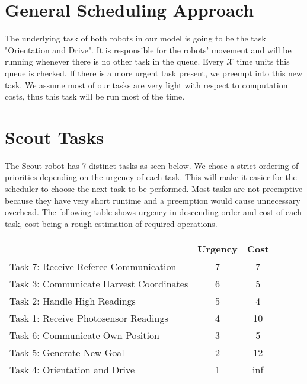 \documentclass[12pt]{article}
\begin{document}

\lstset{language=C}


\section*{General Scheduling Approach}
The underlying task of both robots in our model is going to be the task "Orientation and Drive". It is responsible for the robots' movement and will be running whenever there is no other task in the queue. Every $\mathcal{X}$ time units this queue is checked. If there is a more urgent task present, we preempt into this new task. We assume most of our tasks are very light with respect to computation costs, thus this task will be run most of the time.

\newpage
\section*{Scout Tasks}
The Scout robot has 7 distinct tasks as seen below. We chose a strict ordering of priorities depending on the urgency of each task. This will make it easier for the scheduler to choose the next task to be performed. Most tasks are not preemptive because they have very short runtime and a preemption would cause unnecessary overhead. The following table shows urgency in descending order and cost of each task, cost being a rough estimation of required operations.
\begin{center}
\begin{tabular}{| l | | c | c |}
  \hline
	& Urgency & Cost \\
  \hline
  Task 7: Receive Referee Communication & 7 & 7 \\
  Task 3: Communicate Harvest Coordinates & 6 & 5 \\
  Task 2: Handle High Readings & 5 & 4 \\
  Task 1: Receive Photosensor Readings & 4 & 10 \\
  Task 6: Communicate Own Position &  3 & 5 \\
  Task 5: Generate New Goal &  2 & 12\\
  Task 4: Orientation and Drive &  1 & inf \\
  \hline
\end{tabular}
\end{center}
\vspace*{1cm}
\end{document}
